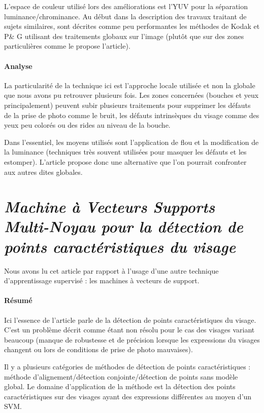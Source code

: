 \documentclass[11pt, french]{report-rd-info}
\begin{document}
L’espace de couleur utilisé lors des améliorations est l’YUV pour la séparation luminance/chrominance.
Au début dans la description des travaux traitant de sujets similaires, sont décrites comme peu performantes les méthodes de Kodak et P\& G utilisant des traitements globaux sur l'image (plutôt que sur des zones particulières comme le propose l’article).

\paragraph{Analyse}
La particularité de la technique ici est l’approche locale utilisée et non la globale que nous avons pu retrouver plusieurs fois. Les zones concernées (bouches et yeux principalement) peuvent subir plusieurs traitements pour supprimer les défauts de la prise de photo comme le bruit, les défauts intrinsèques du visage comme des yeux peu colorés ou des rides au niveau de la bouche. 

Dans l’essentiel, les moyens utilisés sont l’application de flou et la modification de la luminance (techniques très souvent utilisées pour masquer les défauts et les estomper). L’article propose donc une alternative que l’on pourrait confronter aux autres dites globales.

\section{\emph{Machine à Vecteurs Supports Multi-Noyau pour la détection de points caractéristiques du visage}}
Nous avons lu cet article \cite{Rapp2012} par rapport à l’usage d’une autre technique d’apprentissage supervisé : les machines à vecteurs de support.

\paragraph{Résumé}
Ici l'essence de l'article parle de la détection de points caractéristiques du visage.
C’est un problème décrit comme étant non résolu pour le cas des visages variant beaucoup (manque de robustesse et de précision lorsque les expressions du visages changent ou lors de conditions de prise de photo mauvaises).

Il y a plusieurs catégories de méthodes de détection de points caractéristiques :
méthode d'alignement/détection conjointe/détection de points sans modèle global.
Le domaine d'application de la méthode est la détection des points caractéristiques sur des visages ayant des expressions différentes au moyen d’un SVM.
\end{document}

